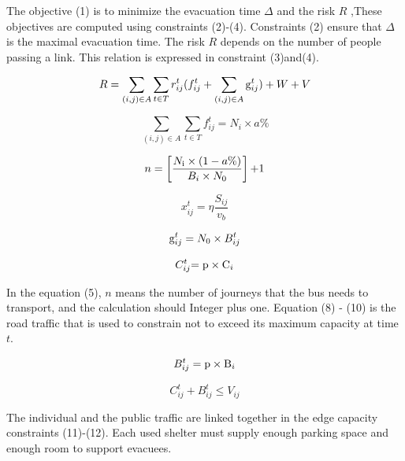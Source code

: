 \documentclass{mcmthesis}
\begin{document}
The objective (1) is to minimize the evacuation time $\Delta $ and the risk $R$ ,These objectives are computed using constraints (2)-(4). Constraints (2) ensure that $\Delta $ is the maximal evacuation time. The risk $R$ depends on the number of people passing a link. This relation is expressed in constraint (3)and(4).

\begin{equation}\label{5}
 R = \sum\limits_{(i,j) \in A} {\sum\limits_{t \in T} {r_{ij}^t} } (f_{ij}^t + \sum\limits_{(i,j) \in A} {{\rm{g}}_{ij}^t} ) + W + V
\end{equation}

\begin{equation}\label{6}
\sum\limits_{(i,j) \in A} {\sum\limits_{t \in T} {f_{ij}^t} }  = {N_i} \times a\%
\end{equation}

\begin{equation}\label{7}
n = \left[ {\frac{{{N_{\rm{i}}} \times (1 - a\% )}}{{{B_i} \times {N_0}}}} \right]{\rm{ + }}1
\end{equation}

\begin{equation}\label{8}
x_{ij}^t = \eta \frac{{{S_{ij}}}}{{{v_b}}}
\end{equation}

\begin{equation}\label{9}
{\rm{g}}_{ij}^t = {N_0} \times B_{ij}^t
\end{equation}

\begin{equation}\label{10}
C_{ij}^t{\rm{ = p}} \times {{\rm{C}}_i}
\end{equation}

In the equation (5), $n$ means the number of journeys that the bus needs to transport, and the calculation should Integer plus one. Equation (8) - (10) is the road traffic that is used to constrain not to exceed its maximum capacity at time $t$.

\begin{equation}\label{11}
B_{ij}^t = {\rm{p}} \times {{\rm{B}}_i}
\end{equation}

\begin{equation}\label{12}
C_{ij}^t + B_{ij}^t \le {V_{ij}}
\end{equation}

The individual and the public traffic are linked together in the edge capacity constraints (11)-(12). Each used shelter must supply enough parking space and enough room to support evacuees.
\end{document}
